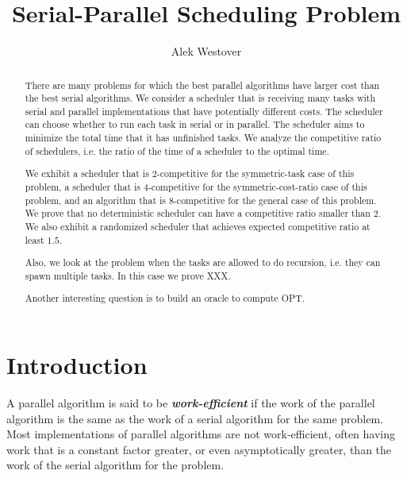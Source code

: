 \documentclass[twocolumn]{article}[10pt]
\author{Alek Westover}
\title{Serial-Parallel Scheduling Problem}
\newcommand{\defn}[1]{{\textit{\textbf{\boldmath #1}}}\xspace}
\begin{document}
\maketitle

\begin{abstract}
  There are many problems for which the best parallel algorithms
  have larger cost than the best serial algorithms. 
  We consider a scheduler that is receiving many tasks with
  serial and parallel implementations that have potentially
  different costs. The scheduler can choose whether to run each
  task in serial or in parallel.
  The scheduler aims to minimize the total time that it has
  unfinished tasks. We analyze the competitive ratio of
  schedulers, i.e. the ratio of the time of a scheduler to the
  optimal time.

  We exhibit a scheduler that is $2$-competitive for the
  symmetric-task case of this problem, a scheduler that is
  $4$-competitive for the symmetric-cost-ratio case of this
  problem, and an algorithm that is $8$-competitive for the
  general case of this problem.
  We prove that no deterministic scheduler can have a competitive
  ratio smaller than $2$.
  We also exhibit a randomized scheduler that achieves
  expected competitive ratio at least $1.5$.

  Also, we look at the problem when the tasks are allowed to do
  recursion, i.e. they can spawn multiple tasks. In this case we
  prove XXX.

  Another interesting question is to build an oracle to compute
  OPT. 

\end{abstract}

\section{Introduction}
A parallel algorithm is said to be \defn{work-efficient} if the
work of the parallel algorithm is the same as the work of a
serial algorithm for the same problem. Most implementations of
parallel algorithms are not work-efficient, often having work
that is a constant factor greater, or even asymptotically
greater, than the work of the serial algorithm for the problem.
\end{document}
